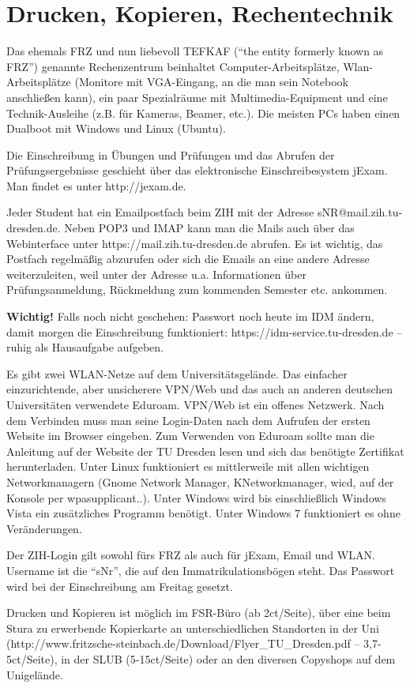 \documentclass[a4paper,12pt]{report}
\begin{document}
\section{Drucken, Kopieren, Rechentechnik}
\begin{itemize*}
\item Das ehemals FRZ und nun liebevoll TEFKAF (``the entity formerly known as FRZ'') genannte Rechenzentrum beinhaltet Computer-Arbeitsplätze, Wlan-Arbeitsplätze (Monitore mit VGA-Eingang, an die man sein Notebook anschließen kann), ein paar Spezialräume mit Multimedia-Equipment und eine Technik-Ausleihe (z.B. für Kameras, Beamer, etc.). Die meisten PCs haben einen Dualboot mit Windows und Linux (Ubuntu).
\item Die Einschreibung in Übungen und Prüfungen und das Abrufen der Prüfungsergebnisse geschieht über das elektronische Einschreibesystem jExam. Man findet es unter http://jexam.de.
\item Jeder Student hat ein Emailpostfach beim ZIH mit der Adresse sNR@mail.zih.tu-dresden.de. Neben POP3 und IMAP kann man die Mails auch über das Webinterface unter https://mail.zih.tu-dresden.de abrufen. Es ist wichtig, das Postfach regelmäßig abzurufen oder sich die Emails an eine andere Adresse weiterzuleiten, weil unter der Adresse u.a. Informationen über Prüfungsanmeldung, Rückmeldung zum kommenden Semester etc. ankommen.
\item \textbf{Wichtig!} Falls noch nicht geschehen: Passwort noch heute im IDM ändern, damit morgen die Einschreibung funktioniert: https://idm-service.tu-dresden.de -- ruhig als Hausaufgabe aufgeben.
\item Es gibt zwei WLAN-Netze auf dem Universitätsgelände. Das einfacher einzurichtende, aber unsicherere VPN/Web und das auch an anderen deutschen Universitäten verwendete Eduroam. VPN/Web ist ein offenes Netzwerk. Nach dem Verbinden muss man seine Login-Daten nach dem Aufrufen der ersten Website im Browser eingeben. Zum Verwenden von Eduroam sollte man die Anleitung auf der Website der TU Dresden lesen und sich das benötigte Zertifikat herunterladen. Unter Linux funktioniert es mittlerweile mit allen wichtigen Networkmanagern (Gnome Network Manager, KNetworkmanager, wicd, auf der Konsole per wpasupplicant..). Unter Windows wird bis einschließlich Windows Vista ein zusätzliches Programm benötigt. Unter Windows 7 funktioniert es ohne Veränderungen.
\item Der ZIH-Login gilt sowohl fürs FRZ als auch für jExam, Email und WLAN. Username ist die ``sNr'', die auf den Immatrikulationsbögen steht. Das Passwort wird bei der Einschreibung am Freitag gesetzt.
\item Drucken und Kopieren ist möglich im FSR-Büro (ab 2ct/Seite), über eine beim Stura zu erwerbende Kopierkarte an unterschiedlichen Standorten in der Uni (http://www.fritzsche-steinbach.de/Download/Flyer\_TU\_Dresden.pdf -- 3,7-5ct/Seite), in der SLUB (5-15ct/Seite) oder an den diversen Copyshops auf dem Unigelände.
\end{itemize*}
\end{document}
